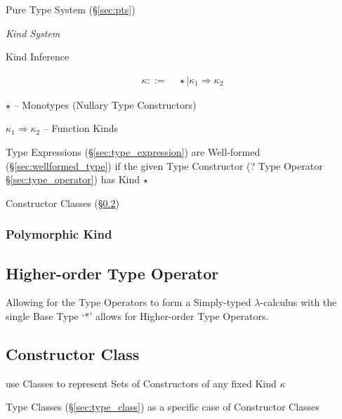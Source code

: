 Pure Type System (\S\ref{sec:pts})


\cite{jones95}


\emph{Kind System}

Kind Inference

\begin{align*}
  \kappa ::= &\; \star \mid \kappa_1 \Rightarrow \kappa_2
\end{align*}

$\star$ -- Monotypes (Nullary Type Constructors)

$\kappa_1 \Rightarrow \kappa_2$ -- Function Kinds

Type Expressions (\S\ref{sec:type_expression}) are Well-formed
(\S\ref{sec:wellformed_type}) if the given Type Constructor (? Type
Operator \S\ref{sec:type_operator}) has Kind $\star$

Constructor Classes (\S\ref{sec:constructor_class})



\subsubsection{Polymorphic Kind}\label{sec:polymorphic_kind}



\subsection{Higher-order Type Operator}
\label{sec:higherorder_typeoperator}

Allowing for the Type Operators to form a Simply-typed
$\lambda$-calculus with the single Base Type `$*$' allows for
Higher-order Type Operators.



\subsection{Constructor Class}\label{sec:constructor_class}

use Classes to represent Sets of Constructors of any fixed Kind
$\kappa$

Type Classes (\S\ref{sec:type_class}) as a specific case of
Constructor Classes

